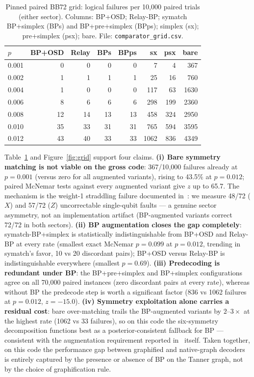 \documentclass[11pt,a4paper]{article}
\begin{document}
\begin{table}[H]\centering\small
\caption{Pinned paired BB72 grid: logical failures per 10{,}000 paired
  trials (either sector). Columns: BP+OSD; Relay-BP; symatch
  BP+simplex (BPs) and BP+pre+simplex (BPps); simplex (sx);
  pre+simplex (psx); bare. File: \texttt{comparator\_grid.csv}.}
\label{tab:grid}
\begin{tabular}{@{}lrrrrrrr@{}}
\toprule
$p$ & BP+OSD & Relay & BPs & BPps & sx & psx & bare \\\midrule
0.001 & 0 & 0 & 0 & 0 & 7 & 4 & 367 \\
0.002 & 1 & 1 & 1 & 1 & 25 & 16 & 760 \\
0.004 & 1 & 0 & 0 & 0 & 117 & 63 & 1630 \\
0.006 & 8 & 6 & 6 & 6 & 298 & 199 & 2360 \\
0.008 & 12 & 14 & 13 & 13 & 458 & 324 & 2950 \\
0.010 & 35 & 33 & 31 & 31 & 765 & 594 & 3595 \\
0.012 & 43 & 40 & 33 & 33 & 1062 & 836 & 4349 \\
\bottomrule
\end{tabular}
\end{table}

Table~\ref{tab:grid} and Figure~\ref{fig:grid} support four claims.
\textbf{(i) Bare symmetry matching is not viable on the gross code}:
367/10{,}000 failures already at $p=0.001$ (versus zero for all augmented
variants), rising to 43.5\% at $p=0.012$; paired McNemar tests against every
augmented variant give $z$ up to 65.7. The mechanism is the weight-1
straddling failure documented in~\cite{SahayBrown2026}: we measure 48/72
($X$) and 57/72 ($Z$) uncorrectable single-qubit faults --- a genuine
sector asymmetry, not an implementation artifact (BP-augmented variants
correct 72/72 in both sectors).
\textbf{(ii) BP augmentation closes the gap completely}:
symatch-BP+simplex is statistically indistinguishable from BP+OSD and
Relay-BP at every rate (smallest exact McNemar $p=0.099$ at $p=0.012$,
trending in symatch's favor, 10 vs 20 discordant pairs); BP+OSD versus
Relay-BP is indistinguishable everywhere (smallest $p=0.69$).
\textbf{(iii) Predecoding is redundant under BP}: the BP+pre+simplex and
BP+simplex configurations agree on all 70{,}000 paired instances (zero
discordant pairs at every rate), whereas without BP the predecode step is
worth a significant factor (836 vs 1062 failures at $p=0.012$, $z=-15.0$).
\textbf{(iv) Symmetry exploitation alone carries a residual cost}: bare
over-matching trails the BP-augmented variants by $2$--$3\times$ at the
highest rate (1062 vs 33 failures), so on this code the six-symmetry
decomposition functions best as a posterior-consistent fallback for BP ---
consistent with the augmentation requirement reported
in~\cite{SahayBrown2026} itself.
Taken together, on this code the performance gap between graphified and
native-graph decoders is entirely captured by the presence or absence of
BP on the Tanner graph, not by the choice of graphification rule.
\end{document}
